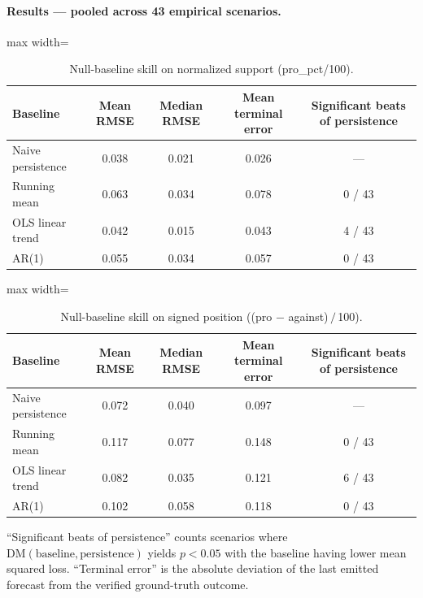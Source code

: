 \documentclass[12pt]{article}
\begin{document}
\paragraph{Results --- pooled across 43 empirical scenarios.}

\begin{table}[H]
\centering
\caption{Null-baseline skill on normalized support (pro\_pct/100).}
\label{tab:dm_support}
\begin{adjustbox}{max width=\textwidth}
\begin{tabular}{@{}lcccc@{}}
\toprule
Baseline & Mean RMSE & Median RMSE & Mean terminal error & Significant beats of persistence \\
\midrule
Naive persistence & 0.038 & 0.021 & 0.026 & --- \\
Running mean      & 0.063 & 0.034 & 0.078 & 0 / 43 \\
OLS linear trend  & 0.042 & 0.015 & 0.043 & 4 / 43 \\
AR(1)             & 0.055 & 0.034 & 0.057 & 0 / 43 \\
\bottomrule
\end{tabular}
\end{adjustbox}
\end{table}

\begin{table}[H]
\centering
\caption{Null-baseline skill on signed position ((pro $-$ against)$\,/\,$100).}
\label{tab:dm_signed}
\begin{adjustbox}{max width=\textwidth}
\begin{tabular}{@{}lcccc@{}}
\toprule
Baseline & Mean RMSE & Median RMSE & Mean terminal error & Significant beats of persistence \\
\midrule
Naive persistence & 0.072 & 0.040 & 0.097 & --- \\
Running mean      & 0.117 & 0.077 & 0.148 & 0 / 43 \\
OLS linear trend  & 0.082 & 0.035 & 0.121 & 6 / 43 \\
AR(1)             & 0.102 & 0.058 & 0.118 & 0 / 43 \\
\bottomrule
\end{tabular}
\end{adjustbox}

\vspace{4pt}
\footnotesize ``Significant beats of persistence'' counts scenarios where $\text{DM}(\text{baseline}, \text{persistence})$ yields $p < 0.05$ with the baseline having lower mean squared loss. ``Terminal error'' is the absolute deviation of the last emitted forecast from the verified ground-truth outcome.
\end{table}
\end{document}
